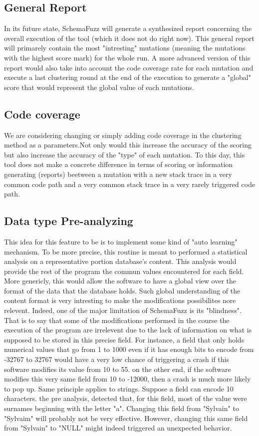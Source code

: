 \documentclass{article}
\begin{document}
\begin{empfile}
		\subsection{General Report}
In its future state, SchemaFuzz will generate a synthesized report concerning the overall execution of the tool (which it does not do right now). This general report will primarely contain the most "intresting" mutations (meaning the mutations with the highest score mark) for the whole run.
A more advanced version of this report would also take into account the code coverage rate for each mutation and execute a last clustering round at the end of the execution to generate a "global" score that would represent the global value of each mutations.
	
		\subsection{Code coverage}
We are considering changing or simply adding code coverage in the clustering method as a parameters.Not only would this increase the accuracy of the scoring but also increase the accuracy of the "type" of each mutation. To this day, this tool does not make a concrete difference in terms of scoring or information generating (reports) beetween a mutation with a new stack trace in a very common code path and a very common stack trace in a very rarely triggered code path.

		\subsection{Data type Pre-analyzing}
This idea for this feature to be is to implement some kind of "auto learning" mechanism.
To be more precise, this routine is meant to performed a statistical analysis on a representative portion database's content. This analysis would provide the rest of the program the commun values encountered for each field. More genericly, this would allow the software to have a global view over the format of the data that the database holds.
Such global understanding of the content format is very intresting to make the modifications possibilites nore relevent. Indeed, one of the major limitation of SchemaFuzz is its "blindness".
That is to say that some of the modifications performed in the course the execution of the program are irrelevent due to the lack of information on what is supposed to be stored in this precise field.
For instance, a field that only holds numerical values that go from 1 to 1000 even if it has enough bits to encode from -32767 to 32767 would have a very low chance of triggering a crash if this software modifies its value from 10 to 55.
on the other end, if the software modifies this very same field from 10 to -12000, then a crash is much more likely to pop up.
Same principle applies to strings. Suppose a field can encode 10 characters.
the pre analysis, detected that, for this field, most of the value were surnames beginning with the letter "a". Changing this field from "Sylvain" to "Sylvaim" will probably not be very effective. However, changing this same field from "Sylvain" to "NULL" might indeed triggered an unexpected behavior. 
  

\end{empfile}
\end{document}
